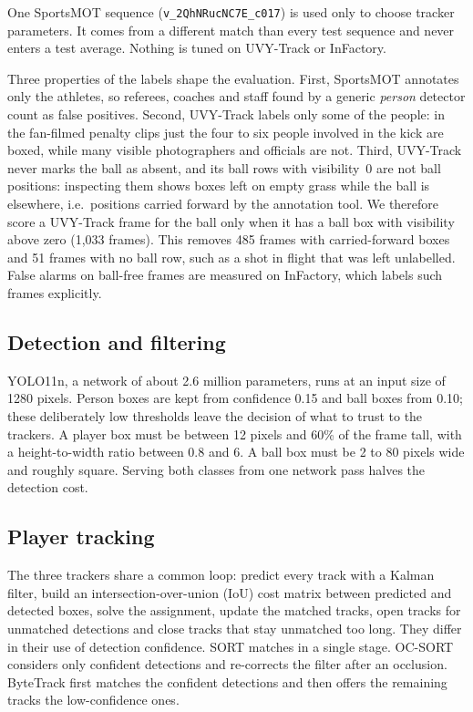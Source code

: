 \documentclass[conference]{IEEEtran}
\begin{document}
One SportsMOT sequence (\texttt{v\_2QhNRucNC7E\_c017}) is used only to choose
tracker parameters. It comes from a different match than every test sequence and
never enters a test average. Nothing is tuned on UVY-Track or InFactory.

Three properties of the labels shape the evaluation. First, SportsMOT annotates
only the athletes, so referees, coaches and staff found by a generic
\emph{person} detector count as false positives. Second, UVY-Track labels only
some of the people: in the fan-filmed penalty clips just the four to six people
involved in the kick are boxed, while many visible photographers and officials
are not. Third, UVY-Track never marks the ball as absent, and its ball rows with
visibility~0 are not ball positions: inspecting them shows boxes left on empty
grass while the ball is elsewhere, i.e.\ positions carried forward by the
annotation tool. We therefore score a UVY-Track frame for the ball only when it
has a ball box with visibility above zero (1{,}033 frames). This removes
485 frames with carried-forward boxes and 51 frames with no
ball row, such as a shot in flight that was left unlabelled. False alarms on
ball-free frames are measured on InFactory, which labels such frames explicitly.

\subsection{Detection and filtering}
YOLO11n, a network of about 2.6 million parameters, runs at an input size of
1280 pixels. Person boxes are kept from confidence 0.15 and ball boxes from
0.10; these deliberately low thresholds leave the decision of what to trust to
the trackers. A player box must be between 12 pixels and 60\% of the frame
tall, with a height-to-width ratio between 0.8 and 6. A ball box must be 2 to 80
pixels wide and roughly square. Serving both classes from one network pass
halves the detection cost.

\subsection{Player tracking}
The three trackers share a common loop: predict every track with a Kalman
filter, build an intersection-over-union (IoU) cost matrix between predicted and
detected boxes, solve the assignment, update the matched tracks, open tracks
for unmatched detections and close tracks that stay unmatched too long. They
differ in their use of detection confidence. SORT matches in a single stage.
OC-SORT considers only confident detections and re-corrects the filter after an
occlusion. ByteTrack first matches the confident detections and then offers the
remaining tracks the low-confidence ones.
\end{document}
